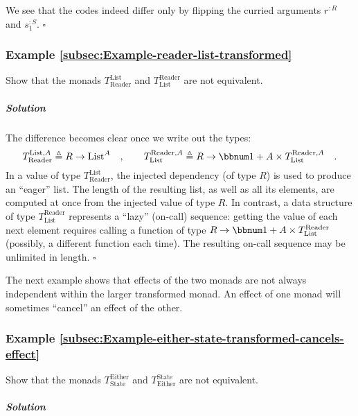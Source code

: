 We see that the codes indeed differ only by flipping the curried arguments
$r^{:R}$ and $s_{1}^{:S}$. $\square$

\subsubsection{Example \label{subsec:Example-reader-list-transformed}\ref{subsec:Example-reader-list-transformed}}

Show that the monads $T_{\text{Reader}}^{\text{List}}$ and $T_{\text{List}}^{\text{Reader}}$
are not equivalent.

\subparagraph{Solution}

The difference becomes clear once we write out the types:
\[
T_{\text{Reader}}^{\text{List},A}\triangleq R\rightarrow\text{List}^{A}\quad,\quad\quad T_{\text{List}}^{\text{Reader},A}\triangleq R\rightarrow\bbnum 1+A\times T_{\text{List}}^{\text{Reader},A}\quad.
\]
In a value of type $T_{\text{Reader}}^{\text{List}}$, the injected
dependency (of type $R$) is used to produce an \textsf{``}eager\textsf{''} list.
The length of the resulting list, as well as all its elements, are
computed at once from the injected value of type $R$. In contrast,
a data structure of type $T_{\text{List}}^{\text{Reader}}$ represents
a \textsf{``}lazy\textsf{''} (on-call) sequence: getting the value of each next element
requires calling a function of type $R\rightarrow\bbnum 1+A\times T_{\text{List}}^{\text{Reader}}$
(possibly, a different function each time). The resulting on-call
sequence may be unlimited in length. $\square$

The next example shows that effects of the two monads are not always
independent within the larger transformed monad. An effect of one
monad will sometimes \textsf{``}cancel\textsf{''} an effect of the other.

\subsubsection{Example \label{subsec:Example-either-state-transformed-cancels-effect}\ref{subsec:Example-either-state-transformed-cancels-effect}}

Show that the monads $T_{\text{State}}^{\text{Either}}$ and $T_{\text{Either}}^{\text{State}}$
are not equivalent.

\subparagraph{Solution}

